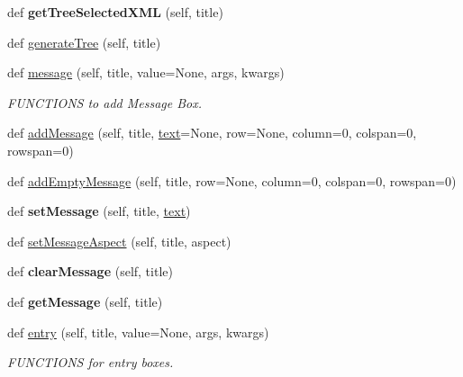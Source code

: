 \begin{DoxyCompactItemize}
\mbox{\label{class_python_01_g_u_i_1_1appjar_1_1gui_a3149f137eef68a07f03dda05a66a0cab}} 
def {\bfseries get\+Tree\+Selected\+X\+ML} (self, title)
\item 
def \hyperlink{class_python_01_g_u_i_1_1appjar_1_1gui_a1bfdd797681473135fe30e5bc16665ef}{generate\+Tree} (self, title)
\item 
def \hyperlink{class_python_01_g_u_i_1_1appjar_1_1gui_a272e00ba02f4665ddbcc731f83191afd}{message} (self, title, value=None, args, kwargs)
\begin{DoxyCompactList}\small\item\em F\+U\+N\+C\+T\+I\+O\+NS to add Message Box. \end{DoxyCompactList}\item 
def \hyperlink{class_python_01_g_u_i_1_1appjar_1_1gui_a1bcf7d9e270df5a34c9e718db68925a7}{add\+Message} (self, title, \hyperlink{class_python_01_g_u_i_1_1appjar_1_1gui_a6a060ddfec169e464326a0dd179a559e}{text}=None, row=None, column=0, colspan=0, rowspan=0)
\item 
def \hyperlink{class_python_01_g_u_i_1_1appjar_1_1gui_aa9f4d3a2a2fc3c7106677fa4d951d9a5}{add\+Empty\+Message} (self, title, row=None, column=0, colspan=0, rowspan=0)
\item 
\mbox{\label{class_python_01_g_u_i_1_1appjar_1_1gui_a31318e0fc887494fd58afced3216b199}} 
def {\bfseries set\+Message} (self, title, \hyperlink{class_python_01_g_u_i_1_1appjar_1_1gui_a6a060ddfec169e464326a0dd179a559e}{text})
\item 
def \hyperlink{class_python_01_g_u_i_1_1appjar_1_1gui_a89d1599f7c833480395b1f2556b6c433}{set\+Message\+Aspect} (self, title, aspect)
\item 
\mbox{\label{class_python_01_g_u_i_1_1appjar_1_1gui_a1b5cafdeea6f726b4a01caf18ef6be7b}} 
def {\bfseries clear\+Message} (self, title)
\item 
\mbox{\label{class_python_01_g_u_i_1_1appjar_1_1gui_a2770300c85cd31a8171f88b31a4968b2}} 
def {\bfseries get\+Message} (self, title)
\item 
def \hyperlink{class_python_01_g_u_i_1_1appjar_1_1gui_adb96d524b25591d68fc650525739641b}{entry} (self, title, value=None, args, kwargs)
\begin{DoxyCompactList}\small\item\em F\+U\+N\+C\+T\+I\+O\+NS for entry boxes. \end{DoxyCompactList}\item 

\end{DoxyCompactItemize}
